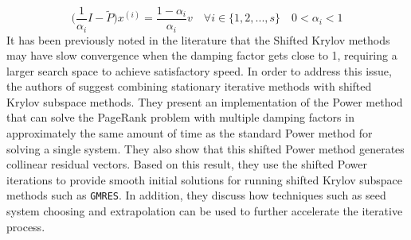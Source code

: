 \begin{equation}
    \Big(\frac{1}{\alpha_i}I - \tilde P \Big)x^{(i)} = \frac{1 - \alpha_i}{\alpha_i}v \quad \forall i \in \{1, 2, ..., s\} \quad 0 < \alpha_i < 1
\end{equation}
It has been previously noted in the literature that the Shifted Krylov methods may have slow convergence when the damping factor gets close to 1, requiring a larger search space to achieve satisfactory speed. In order to address this issue, the authors of \cite{SHEN2022126799} suggest combining stationary iterative methods with shifted Krylov subspace methods. They present an implementation of the Power method that can solve the PageRank problem with multiple damping factors in approximately the same amount of time as the standard Power method for solving a single system. They also show that this shifted Power method generates collinear residual vectors. Based on this result, they use the shifted Power iterations to provide smooth initial solutions for running shifted Krylov subspace methods such as \texttt{GMRES}. In addition, they discuss how techniques such as seed system choosing and extrapolation can be used to further accelerate the iterative process.


